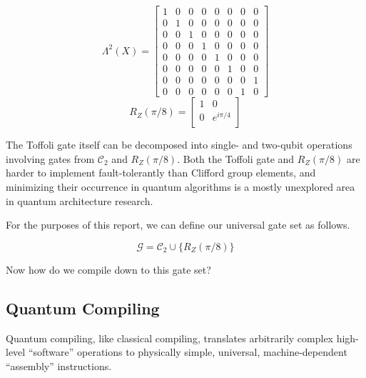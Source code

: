 \begin{equation}
\Lambda^2(X) = 
 \left[
  \begin{array}{cccccccc}
    1 & 0 & 0 & 0 & 0 & 0 & 0 & 0\\
    0 & 1 & 0 & 0 & 0 & 0 & 0 & 0\\
    0 & 0 & 1 & 0 & 0 & 0 & 0 & 0\\
    0 & 0 & 0 & 1 & 0 & 0 & 0 & 0\\
    0 & 0 & 0 & 0 & 1 & 0 & 0 & 0\\
    0 & 0 & 0 & 0 & 0 & 1 & 0 & 0\\
    0 & 0 & 0 & 0 & 0 & 0 & 0 & 1\\
    0 & 0 & 0 & 0 & 0 & 0 & 1 & 0
  \end{array} \right]
\end{equation}
\begin{equation}
 R_Z(\pi/8) = 
 \left[
  \begin{array}{cc}
    1 & 0 \\
    0 & e^{i\pi/4} \\
  \end{array} \right]
\end{equation}

The Toffoli gate itself can be decomposed into single- and two-qubit
operations involving gates from $\mathcal{C}_2$ and $R_Z(\pi/8)$.
Both the Toffoli gate and $R_Z(\pi/8)$ are harder to implement
fault-tolerantly than
Clifford group elements, and minimizing their occurrence in quantum
algorithms is a mostly unexplored area in quantum architecture research.

For the purposes of this report, we can define our universal gate set
as follows.

\begin{equation}
\mathcal{G} = \mathcal{C}_2 \cup \{ R_Z(\pi/8) \}
\end{equation}

Now how do we compile down to this gate set?

\subsection{Quantum Compiling}
\label{subsec:compile}

Quantum compiling, like
classical compiling, translates arbitrarily complex high-level ``software''
operations to physically simple,
universal, machine-dependent ``assembly'' instructions.

